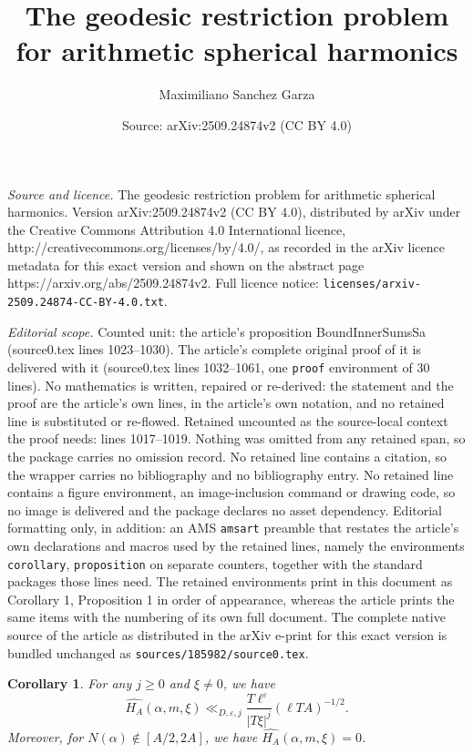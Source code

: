 \documentclass[10pt,a4paper]{amsart}
\title{The geodesic restriction problem for arithmetic spherical harmonics}
\author{Maximiliano Sanchez Garza}
\date{Source: arXiv:2509.24874v2 (CC BY 4.0)}
\newtheorem{corollary}{Corollary}
\begin{document}
\maketitle

\noindent\emph{Source and licence.} The geodesic restriction problem for arithmetic spherical harmonics. Version arXiv:2509.24874v2 (CC BY 4.0), distributed by arXiv under the Creative Commons Attribution 4.0 International licence, http://creativecommons.org/licenses/by/4.0/, as recorded in the arXiv licence metadata for this exact version and shown on the abstract page https://arxiv.org/abs/2509.24874v2. Full licence notice: \texttt{licenses/arxiv-2509.24874-CC-BY-4.0.txt}.\par\smallskip

\noindent\textit{Editorial scope.} Counted unit: the article's proposition BoundInnerSumsSa (source0.tex lines 1023--1030). The article's complete original proof of it is delivered with it (source0.tex lines 1032--1061, one \texttt{proof} environment of 30 lines). No mathematics is written, repaired or re-derived: the statement and the proof are the article's own lines, in the article's own notation, and no retained line is substituted or re-flowed.  Retained uncounted as the source-local context the proof needs: lines 1017--1019.  Nothing was omitted from any retained span, so the package carries no omission record.  No retained line contains a citation, so the wrapper carries no bibliography and no bibliography entry.  No retained line contains a figure environment, an image-inclusion command or drawing code, so no image is delivered and the package declares no asset dependency.  Editorial formatting only, in addition: an AMS \texttt{amsart} preamble that restates the article's own declarations and macros used by the retained lines, namely the environments \texttt{corollary}, \texttt{proposition} on separate counters, together with the standard packages those lines need.  The retained environments print in this document as Corollary 1, Proposition 1 in order of appearance, whereas the article prints the same items with the numbering of its own full document.  The complete native source of the article as distributed in the arXiv e-print for this exact version is bundled unchanged as \texttt{sources/185982/source0.tex}.
\begin{corollary}\label{BoundHATransform}
For any $j\geq 0$ and $\xi\neq 0$, we have $$ \widehat{H_A}(\alpha,m,\xi) \ll_{D,\varepsilon,j} \frac{T \ell^{\varepsilon}}{|T\xi|^{j}} (\ell TA)^{-1/2}.$$ Moreover, for $N(\alpha) \notin [A/2,2A]$, we have $\widehat{H_A}(\alpha,m,\xi)=0$.
\end{corollary}
\end{document}
